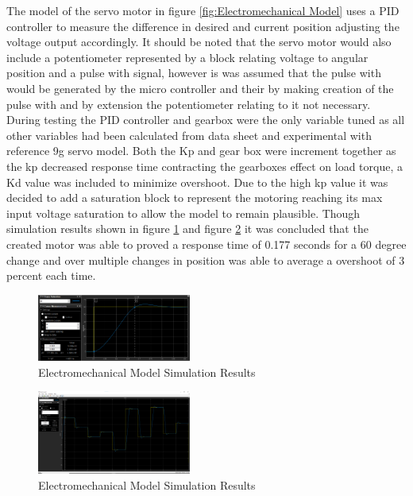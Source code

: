 The model of the servo motor in figure \ref{fig:Electromechanical Model} uses a PID controller to measure the difference in desired and current position adjusting the voltage output accordingly. It should be noted that the servo motor would also include a potentiometer represented by a block relating voltage to angular position and a pulse with signal, however is was assumed that the pulse with would be generated by the micro controller and their by making creation of the pulse with and by extension the potentiometer relating to it not necessary. During testing the PID controller and gearbox were the only variable tuned as all other variables had been calculated from data sheet and experimental with reference 9g servo model. Both the Kp and gear box were increment together as the kp decreased response time contracting the gearboxes effect on load torque, a Kd value was included to minimize overshoot. Due to the high kp value it was decided to add a saturation block to represent the motoring reaching its max input voltage saturation to allow the model to remain plausible. Though simulation results shown in figure \ref{fig:Electromechanical Model Simulation Results} and figure \ref{fig:Electromechanical Model Simulation varying input positions}  it was concluded that the created motor was able to proved a response time of 0.177 seconds for a 60 degree change and over multiple changes in position was able to average a overshoot of 3 percent each time. 
\begin{figure}[h]
 \centering
   \includegraphics[width = 0.45\textwidth]{figures/8.png}                \caption{Electromechanical Model Simulation Results}
   \label{fig:Electromechanical Model Simulation Results}
\end{figure}
\begin{figure}[h]
 \centering
   \includegraphics[width = 0.45\textwidth]{figures/9.png}                \caption{Electromechanical Model Simulation Results}
   \label{fig:Electromechanical Model Simulation varying input positions}
\end{figure}







